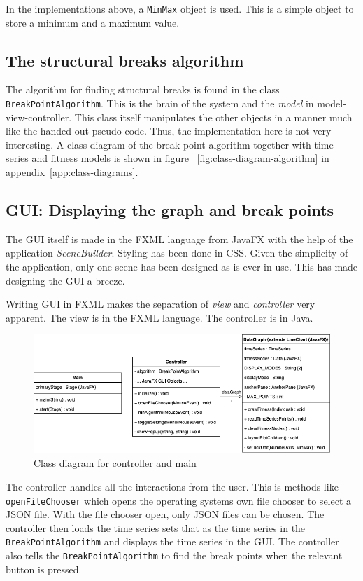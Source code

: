 In the implementations above, a \texttt{MinMax} object is used. This is a simple
object to store a minimum and a maximum value. 

\subsection{The structural breaks algorithm}

The algorithm for finding structural breaks is found in the class
\texttt{BreakPointAlgorithm}. This is the brain of the system and the
\textit{model} in model-view-controller. This class itself manipulates the other
objects in a manner much like the handed out pseudo code. Thus, the
implementation here is not very interesting. A class diagram of the break point
algorithm together with time series and fitness models is shown in figure
~\ref{fig:class-diagram-algorithm} in appendix~\ref{app:class-diagrams}.


\subsection{GUI: Displaying the graph and break points}
\label{sec:graph-implementation}

The GUI itself is made in the FXML language from JavaFX with the help of the
application \textit{SceneBuilder}. Styling has been done in CSS. Given the simplicity of the application, only one
scene has been designed as is ever in use. This has made 
designing the GUI a breeze. 

Writing GUI in FXML makes the separation of \textit{view} and
\textit{controller} very apparent. The view is in the FXML language. The
controller is in Java. 

\begin{figure}[ht]
    \centering
    \includegraphics[width=.8\textwidth]{fig/class-diagram-controller.png}
    \caption{Class diagram for controller and main}
    \label{fig:class-diagram-controller}
\end{figure}

The controller handles all the interactions from the user. This is methods like
\texttt{openFileChooser} which opens the operating systems own file chooser to
select a JSON file. With the file chooser open, only JSON files can be chosen.
The controller then loads the time series sets that as the time series in the
\texttt{BreakPointAlgorithm} and displays the time series in the GUI. The
controller also tells the \texttt{BreakPointAlgorithm} to find the break points
when the relevant button is pressed. 

